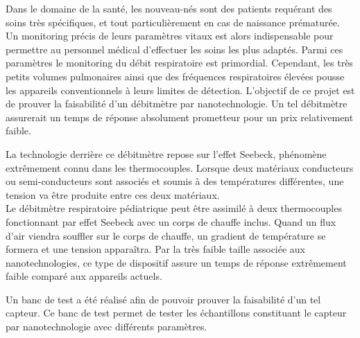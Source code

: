 Dans le domaine de la santé, les nouveau-nés sont des patients requérant des soins très spécifiques, et tout particulièrement en cas de 
naissance prématurée. Un monitoring précis de leurs paramètres vitaux est alors indispensable pour permettre au personnel médical d'effectuer 
les soins les plus adaptés. Parmi ces paramètres le monitoring du débit respiratoire est primordial. Cependant, les très petits volumes 
pulmonaires ainsi que des fréquences respiratoires élevées pousse les appareils conventionnels à leurs limites de détection. L'objectif de ce 
projet est de prouver la faisabilité d'un débitmètre par nanotechnologie. Un tel débitmètre assurerait un temps de réponse absolument prometteur pour 
un prix relativement faible. 

\asterism

La technologie derrière ce débitmètre repose sur l'effet Seebeck, phénomène extrêmement connu dans les thermocouples. Lorsque deux matériaux 
conducteurs ou semi-conducteurs sont associés et soumis à des températures différentes, une tension va être produite entre ces deux matériaux. \\
Le débitmètre respiratoire pédiatrique peut être assimilé à deux thermocouples fonctionnant par effet Seebeck avec un corps de chauffe inclus. 
Quand un flux d'air viendra souffler sur le corps de chauffe, un gradient de température se formera et une tension apparaîtra. Par la très faible 
taille associée aux nanotechnologies, ce type de dispositif assure un temps de réponse extrêmement faible comparé aux appareils actuels. \\

\asterism

Un banc de test a été réalisé afin de pouvoir prouver la faisabilité d'un tel capteur. Ce banc de test permet de tester les échantillons constituant 
le capteur par nanotechnologie avec différents paramètres. 

